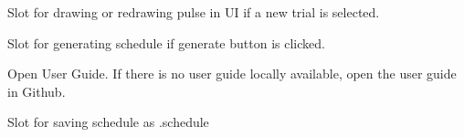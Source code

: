 \documentclass[letterpaper,10pt,english]{sphinxmanual}
\begin{document}
\begin{fulllineitems}
\begin{fulllineitems}
\end{fulllineitems}


\begin{fulllineitems}
\label{\detokenize{NoSeMazeSchedule/scheduleMain:scheduleMain.MainApp.draw_pulse}}
\pysigstartsignatures
{}
\pysigstopsignatures
\sphinxAtStartPar
Slot for drawing or redrawing pulse in UI if a new trial is selected.

\end{fulllineitems}


\begin{fulllineitems}
\label{\detokenize{NoSeMazeSchedule/scheduleMain:scheduleMain.MainApp.generate}}
\pysigstartsignatures
{}
\pysigstopsignatures
\sphinxAtStartPar
Slot for generating schedule if generate button is clicked.

\end{fulllineitems}


\begin{fulllineitems}
\label{\detokenize{NoSeMazeSchedule/scheduleMain:scheduleMain.MainApp.open_user_guide}}
\pysigstartsignatures
{}
\pysigstopsignatures
\sphinxAtStartPar
Open User Guide. If there is no user guide locally available,
open the user guide in Github.

\end{fulllineitems}


\begin{fulllineitems}
\label{\detokenize{NoSeMazeSchedule/scheduleMain:scheduleMain.MainApp.save_schedule}}
\pysigstartsignatures
{}
\pysigstopsignatures
\sphinxAtStartPar
Slot for saving schedule as .schedule


\end{fulllineitems}
\end{fulllineitems}
\end{document}
